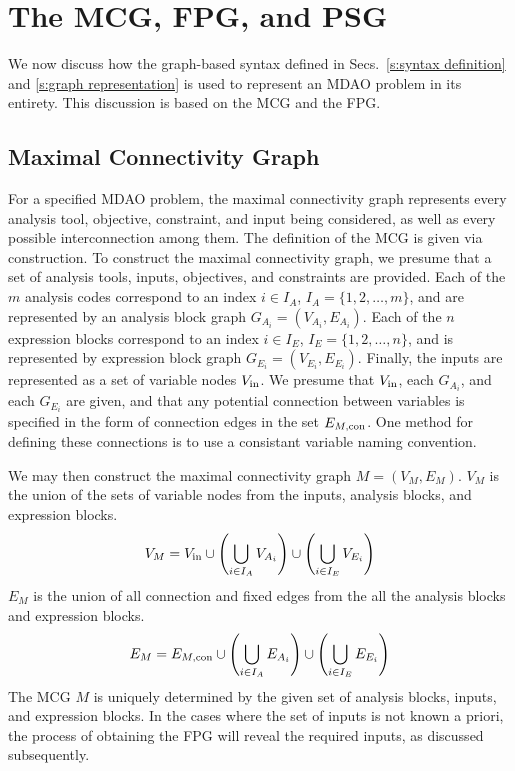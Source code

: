 \section{The MCG, FPG, and PSG}
    \label{s:building graphs}
We now discuss how the graph-based syntax defined in Secs.~\ref{s:syntax definition} and \ref{s:graph representation}  is used to represent an MDAO problem in its entirety. This discussion is based on the MCG and the FPG.

\subsection{Maximal Connectivity Graph}
    \label{ss:MCG}
For a specified MDAO problem, the maximal connectivity graph represents every analysis tool, objective, constraint, and input being considered, as well as every possible interconnection among them.
The definition of the MCG is given via construction.
    To construct the maximal connectivity graph, we presume that a set of analysis tools, inputs, objectives, and constraints are provided. 
    Each of the $m$ analysis codes correspond to an index $i\in I_A$, $I_A=\{1,2,\ldots,m\}$, and are represented by an analysis block graph $G_{A_i}=(V_{A_i},E_{A_i})$.
    Each of the $n$ expression blocks correspond to an index $i\in I_E$, $I_E=\{1,2,\ldots,n\}$, and is represented by expression block graph $G_{E_i}=(V_{E_i},E_{E_i})$.
    Finally, the inputs are represented as a set of variable nodes $V_\textrm{in}$.
    We presume that $V_\textrm{in}$, each $G_{A_i}$, and each $G_{E_i}$ are given, and that any potential connection between variables is specified in the form of connection edges in the set $E_{M,\textrm{con}}$. One method for defining these connections is to use a consistant variable naming convention.

    We may then construct the maximal connectivity graph $M=(V_M,E_M)$. $V_M$ is 
    the union of the sets of variable nodes from the inputs, analysis blocks, and expression blocks. 
    \begin{equation}
    V_M = V_\textrm{in} \cup \left( \bigcup_{i \in I_A} V_{A_i} \right) \cup \left( \bigcup_{i \in I_E} V_{E_i} \right)
    \end{equation}
    $E_M$ is the union of all connection and fixed edges from the all the analysis blocks and expression blocks. 
    \begin{equation}
    E_M = E_{M,\textrm{con}} \cup \left( \bigcup_{i \in I_A} E_{A_i} \right)  \cup \left( \bigcup_{i \in I_E} E_{E_i} \right)
    \end{equation}
    The MCG $M$ is uniquely determined by the given set of analysis blocks, inputs, and expression blocks. 
    In the cases where the set of inputs is not known a priori, the process of obtaining the FPG will reveal the required inputs, as discussed subsequently.

